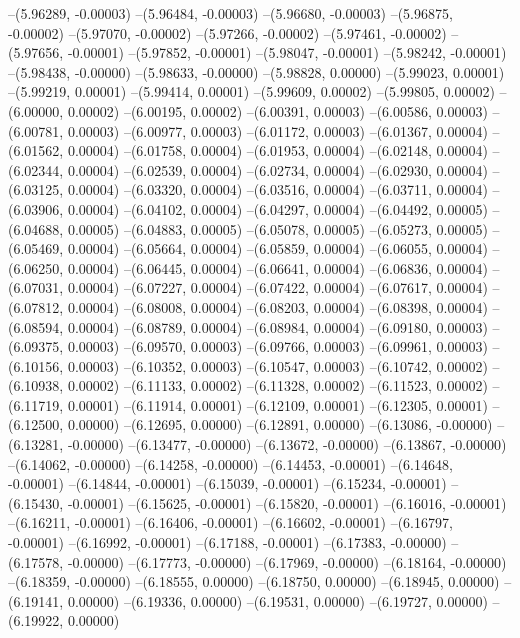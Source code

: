 --(5.96289, -0.00003)
--(5.96484, -0.00003)
--(5.96680, -0.00003)
--(5.96875, -0.00002)
--(5.97070, -0.00002)
--(5.97266, -0.00002)
--(5.97461, -0.00002)
--(5.97656, -0.00001)
--(5.97852, -0.00001)
--(5.98047, -0.00001)
--(5.98242, -0.00001)
--(5.98438, -0.00000)
--(5.98633, -0.00000)
--(5.98828, 0.00000)
--(5.99023, 0.00001)
--(5.99219, 0.00001)
--(5.99414, 0.00001)
--(5.99609, 0.00002)
--(5.99805, 0.00002)
--(6.00000, 0.00002)
--(6.00195, 0.00002)
--(6.00391, 0.00003)
--(6.00586, 0.00003)
--(6.00781, 0.00003)
--(6.00977, 0.00003)
--(6.01172, 0.00003)
--(6.01367, 0.00004)
--(6.01562, 0.00004)
--(6.01758, 0.00004)
--(6.01953, 0.00004)
--(6.02148, 0.00004)
--(6.02344, 0.00004)
--(6.02539, 0.00004)
--(6.02734, 0.00004)
--(6.02930, 0.00004)
--(6.03125, 0.00004)
--(6.03320, 0.00004)
--(6.03516, 0.00004)
--(6.03711, 0.00004)
--(6.03906, 0.00004)
--(6.04102, 0.00004)
--(6.04297, 0.00004)
--(6.04492, 0.00005)
--(6.04688, 0.00005)
--(6.04883, 0.00005)
--(6.05078, 0.00005)
--(6.05273, 0.00005)
--(6.05469, 0.00004)
--(6.05664, 0.00004)
--(6.05859, 0.00004)
--(6.06055, 0.00004)
--(6.06250, 0.00004)
--(6.06445, 0.00004)
--(6.06641, 0.00004)
--(6.06836, 0.00004)
--(6.07031, 0.00004)
--(6.07227, 0.00004)
--(6.07422, 0.00004)
--(6.07617, 0.00004)
--(6.07812, 0.00004)
--(6.08008, 0.00004)
--(6.08203, 0.00004)
--(6.08398, 0.00004)
--(6.08594, 0.00004)
--(6.08789, 0.00004)
--(6.08984, 0.00004)
--(6.09180, 0.00003)
--(6.09375, 0.00003)
--(6.09570, 0.00003)
--(6.09766, 0.00003)
--(6.09961, 0.00003)
--(6.10156, 0.00003)
--(6.10352, 0.00003)
--(6.10547, 0.00003)
--(6.10742, 0.00002)
--(6.10938, 0.00002)
--(6.11133, 0.00002)
--(6.11328, 0.00002)
--(6.11523, 0.00002)
--(6.11719, 0.00001)
--(6.11914, 0.00001)
--(6.12109, 0.00001)
--(6.12305, 0.00001)
--(6.12500, 0.00000)
--(6.12695, 0.00000)
--(6.12891, 0.00000)
--(6.13086, -0.00000)
--(6.13281, -0.00000)
--(6.13477, -0.00000)
--(6.13672, -0.00000)
--(6.13867, -0.00000)
--(6.14062, -0.00000)
--(6.14258, -0.00000)
--(6.14453, -0.00001)
--(6.14648, -0.00001)
--(6.14844, -0.00001)
--(6.15039, -0.00001)
--(6.15234, -0.00001)
--(6.15430, -0.00001)
--(6.15625, -0.00001)
--(6.15820, -0.00001)
--(6.16016, -0.00001)
--(6.16211, -0.00001)
--(6.16406, -0.00001)
--(6.16602, -0.00001)
--(6.16797, -0.00001)
--(6.16992, -0.00001)
--(6.17188, -0.00001)
--(6.17383, -0.00000)
--(6.17578, -0.00000)
--(6.17773, -0.00000)
--(6.17969, -0.00000)
--(6.18164, -0.00000)
--(6.18359, -0.00000)
--(6.18555, 0.00000)
--(6.18750, 0.00000)
--(6.18945, 0.00000)
--(6.19141, 0.00000)
--(6.19336, 0.00000)
--(6.19531, 0.00000)
--(6.19727, 0.00000)
--(6.19922, 0.00000)
